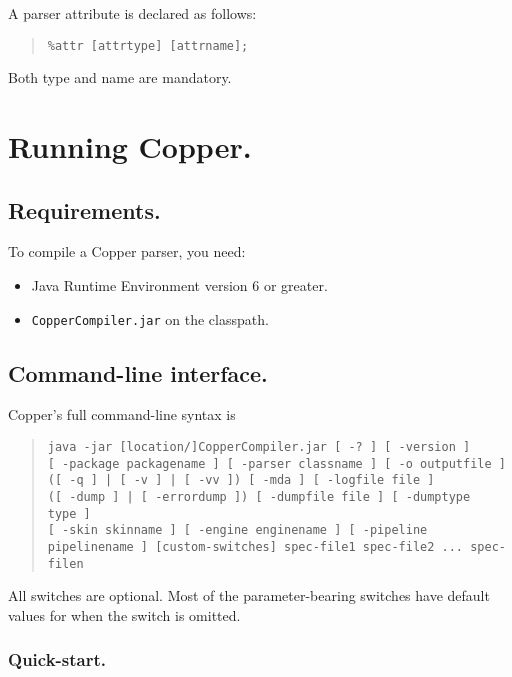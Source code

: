 \documentclass[12pt,english,twoside]{report}
\begin{document}
A parser attribute is declared as follows:

\begin{quote}
\texttt{\%attr {[}attrtype] {[}attrname];}
\end{quote}
Both type and name are mandatory.


\chapter{\label{cha:Running-Copper.}Running Copper.}


\section{Requirements.}

To compile a Copper parser, you need:

\begin{itemize}
\item Java Runtime Environment version 6 or greater.
\item \texttt{CopperCompiler.jar} on the classpath.
\end{itemize}

\section{Command-line interface.}

Copper's full command-line syntax is

\begin{quote}
\texttt{java -jar [location/]CopperCompiler.jar
[~-?~]
[~-version~]}\\
\texttt{[~-package packagename~]
[~-parser classname~]
[~-o outputfile~]}\\
\texttt{([~-q~] | [~-v~] | [~-vv~])
[~-mda~]
[~-logfile file~]}\\
\texttt{([~-dump~] | [~-errordump~])
[~-dumpfile file~]
[~-dumptype type~]}\\
\texttt{[~-skin skinname~]
[~-engine enginename~]
[~-pipeline pipelinename~]
[custom-switches]
spec-file1 spec-file2 ... spec-filen}
\end{quote}

All switches are optional. Most of the parameter-bearing switches have
default values for when the switch is omitted.

\subsection{Quick-start.}
\end{document}
